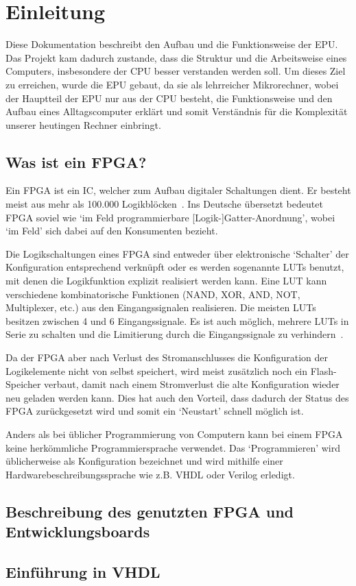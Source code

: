 \chapter{Einleitung}
\label{c:einleitung}
Diese Dokumentation beschreibt den Aufbau und die Funktionsweise der \ac{EPU}.
Das Projekt kam dadurch zustande, dass die Struktur und die Arbeitsweise eines
Computers, insbesondere der \ac{CPU} besser verstanden werden soll. Um dieses
Ziel zu erreichen, wurde die \ac{EPU} gebaut, da sie als lehrreicher
Mikrorechner, wobei der Hauptteil der \ac{EPU} nur aus der \ac{CPU} besteht,
die Funktionsweise und den Aufbau eines Alltagscomputer erklärt und somit
Verständnis für die Komplexität unserer heutingen Rechner einbringt.

\section{Was ist ein FPGA?}
Ein \ac{FPGA} ist ein \ac{IC}, welcher zum Aufbau digitaler Schaltungen
dient. Er besteht meist aus mehr als 100.000 Logikblöcken~\cite[S. 8]{minicpu}.
Ins Deutsche übersetzt bedeutet \ac{FPGA} soviel wie `im Feld programmierbare
[Logik-]Gatter-Anordnung', wobei `im Feld' sich dabei auf den Konsumenten
bezieht.

Die Logikschaltungen eines \ac{FPGA} sind entweder über elektronische `Schalter'
der Konfiguration entsprechend verknüpft oder es werden sogenannte \acp{LUT}
benutzt, mit denen die Logikfunktion explizit realisiert werden kann. Eine
\ac{LUT} kann verschiedene kombinatorische Funktionen (NAND, XOR, AND, NOT,
Multiplexer, etc.) aus den Eingangssignalen realisieren. Die meisten \acp{LUT}
besitzen zwischen 4 und 6 Eingangssignale. Es ist auch möglich, mehrere
\acp{LUT} in Serie zu schalten und die Limitierung durch die Eingangssignale zu
verhindern~\cite{FPGA_Aufbau}.

Da der \ac{FPGA} aber nach Verlust des Stromanschlusses die Konfiguration der
Logikelemente nicht von selbst speichert, wird meist zusätzlich noch ein
Flash-Speicher verbaut, damit nach einem Stromverlust die alte Konfiguration
wieder neu geladen werden kann. Dies hat auch den Vorteil, dass dadurch der
Status des \ac{FPGA} zurückgesetzt wird und somit ein `Neustart' schnell möglich
ist.

Anders als bei üblicher Programmierung von Computern kann bei einem \ac{FPGA}
keine herkömmliche Programmiersprache verwendet. Das `Programmieren' wird
üblicherweise als Konfiguration bezeichnet und wird mithilfe einer
Hardwarebeschreibungssprache wie z.B. VHDL oder Verilog erledigt.
\section{Beschreibung des genutzten FPGA und Entwicklungsboards}
\section{Einführung in VHDL}
